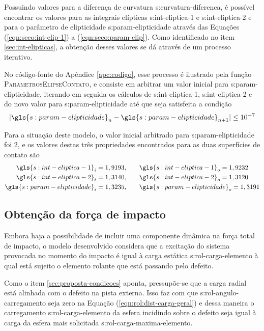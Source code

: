 \documentclass[12pt,oneside,english,brazil,lmodern,siglas,simbolos,cite=num]{ucsmonograph}
\begin{document}
	Possuindo valores para a diferença de curvatura \gls{s:curvatura-diferenca}, é possível encontrar os valores para as integrais elípticas \gls{s:int-eliptica-1} e \gls{s:int-eliptica-2} e para o parâmetro de elipticidade \gls{s:param-elipticidade} através das Equações (\ref{eqn:seco:int-elip-1}) a (\ref{eqn:seco:param-elip}).
	Como identificado no item \ref{sec:int-elipticas}, a obtenção desses valores se dá através de um processo iterativo.
	
	No código-fonte do Apêndice \ref{apc:codigo}, esse processo é ilustrado pela função \textsc{ParametrosElipseContato}, e consiste em arbitrar um valor inicial para \gls{s:param-elipticidade}, iterando em seguida os cálculos de \gls{s:int-eliptica-1}, \gls{s:int-eliptica-2} e do novo valor para \gls{s:param-elipticidade} até que seja satisfeita a condição
	\begin{equation} \label{eqn:mdl:cond-parada-k}
		|\gls{s:param-elipticidade}_n - \gls{s:param-elipticidade}_{n+1}| \leq 10^{-7}
	\end{equation}
	
	Para a situação deste modelo, o valor inicial arbitrado para \gls{s:param-elipticidade} foi $2$, e os valores destas três propriedades encontrados para as duas superfícies de contato são
	\begin{align*}
		\gls{s:int-eliptica-1}_i = 1,9193, &\qquad
		\gls{s:int-eliptica-1}_o = 1,9232 \\
		\gls{s:int-eliptica-2}_i = 1,3140, &\qquad
		\gls{s:int-eliptica-2}_o = 1,3120 \\
		\gls{s:param-elipticidade}_i = 1,3235, &\qquad
		\gls{s:param-elipticidade}_o = 1,3191
	\end{align*}
	
	\subsection{Obtenção da força de impacto} \label{sec:mdl:forca-impacto}
	Embora haja a possibilidade de incluir uma componente dinâmica na força total de impacto, o modelo desenvolvido considera que a excitação do sistema provocada no momento do impacto é igual à carga estática \gls{s:rol-carga-elemento} à qual está sujeito o elemento rolante que está passando pelo defeito.
	
	Como o item \ref{sec:proposta-condicoes} aponta, pressupõe-se que a carga radial está alinhada com o defeito na pista externa.
	Isso faz com que \gls{s:rol-angulo-carregamento} seja zero na Equação (\ref{eqn:rol:dist-carga-geral}) e dessa maneira o carregamento \gls{s:rol-carga-elemento} da esfera incidindo sobre o defeito seja igual à carga da esfera mais solicitada \gls{s:rol-carga-maxima-elemento}. 
	
\end{document}
